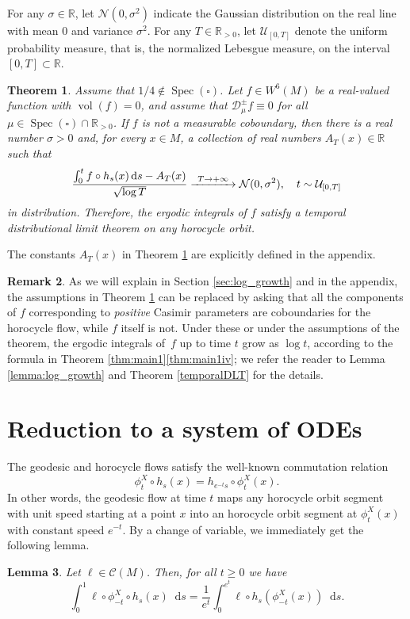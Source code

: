 \documentclass[JEP,XML,SOM,NoEqCountersInSection,Unicode,published]{cedram}
\newcommand\To[1]{\mathchoice{\xrightarrow{\kern4pt#1\kern3pt}}{\stackrel{#1}{\longrightarrow}}{}{}}
\newcommand \R{\mathbb{R}}
\newcommand {\cN}{\mathcal{N}}
\newcommand*{\diff}{\mathop{}\!\mathrm{d}}
\newcommand{\Dpm}[1]{\mathcal{D}_\mu^{\pm} #1}
\DeclareMathOperator{\vol}{vol}
\DeclareMathOperator{\Spec}{Spec}
\newtheorem{theorem}{Theorem}
\newtheorem {lemma}[theorem]{Lemma}
\theoremstyle{definition}
\newtheorem{remark}[theorem]{Remark}
\begin{document}
For any $\sigma\in \R$, let $\cN(0,\sigma^{2})$ indicate the Gaussian distribution on the real line with mean $0$ and variance $\sigma^{2}$. For any $T\in \R_{>0}$, let $\mathcal{U}_{[0,T]}$ denote the uniform probability measure, that is, the normalized Lebesgue measure, on the interval $[0,T]\subset \R$.

\begin{theorem}\label{thm:main_DS}
Assume that $1/4 \notin \Spec(\square)$. Let $f \in W^6(M)$ be a real-valued function with $\vol(f)=0$, and assume that $\Dpm{f} \equiv 0$ for all $\mu \in \Spec(\square) \cap \R_{>0}$.
If $f$ is not a measurable coboundary, then there is a real number $\sigma>0$ and, for every $x \in M$, a collection of real numbers $A_T(x) \in \R$ such that
\[
\frac{\int_0^{t}f\circ h_s(x) \diff s - A_T(x)}{\sqrt{\log{T}}}\To{T\to+\infty}\cN(0,\sigma^{2}), \quad t\sim \mathcal{U}_{[0,T]}
\]
in distribution. Therefore, the ergodic integrals of $f$ satisfy a temporal distributional limit theorem on any horocycle orbit.
\end{theorem}

The constants $A_T(x)$ in Theorem \ref{thm:main_DS} are explicitly defined in the appendix.

\begin{remark}
As we will explain in Section \ref{sec:log_growth} and in the appendix, the assumptions in Theorem \ref{thm:main_DS} can be replaced by asking that all the components of $f$ corresponding to \emph{positive} Casimir parameters are coboundaries for the horocycle flow, while $f$ itself is not. Under these or under the assumptions of the theorem, the ergodic integrals of~$f$ up to time $t$ grow as $\log t$, according to the formula in Theorem \ref{thm:main1}\eqref{thm:main1iv}; we refer the reader to Lemma \ref{lemma:log_growth} and Theorem \ref{temporalDLT} for the details.
\end{remark}

\section{Reduction to a system of ODEs}\label{sec:reduction}

The geodesic and horocycle flows satisfy the well-known commutation relation
\[
\phi^X_t \circ h_s (x) = h_{e^{-t}s} \circ \phi^X_t(x).
\]
In other words, the geodesic flow at time $t$ maps any horocycle orbit segment with unit speed starting at a point $x$ into an horocycle orbit segment at $\phi^X_t(x)$ with constant speed $e^{-t}$.
By a change of variable, we immediately get the following lemma.
\begin{lemma}\label{lemma:c_o_v}
Let $\ell \in \mathscr{C}(M)$. Then, for all $t \geq 0$ we have
\[
\int_0^1 \ell \circ \phi^X_{-t}\circ h_s(x) \diff s = \frac{1}{e^t}\int_0^{e^t} \ell \circ h_s (\phi^X_{-t}(x)) \diff s.
\]
\end{lemma}
\end{document}
